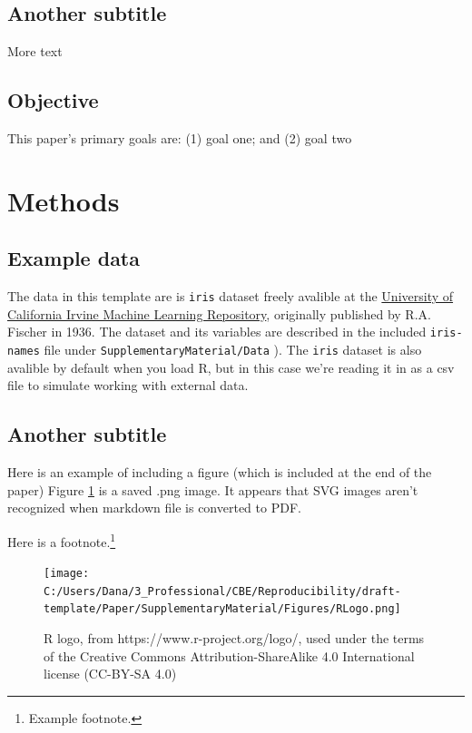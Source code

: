 \documentclass[]{elsarticle} %
\begin{document}
\subsection{Another subtitle}\label{another-subtitle}

More text

\subsection{Objective}\label{objective}

This paper's primary goals are: (1) goal one; and (2) goal two

\section{Methods}\label{methods}

\subsection{Example data}\label{example-data}

The data in this template are is \texttt{iris} dataset freely avalible
at the \href{https://archive.ics.uci.edu/ml/datasets/iris}{University of
California Irvine Machine Learning Repository}, originally published by
R.A. Fischer in 1936. The dataset and its variables are described in the
included \texttt{iris-names} file under
\texttt{SupplementaryMaterial/Data} ). The \texttt{iris} dataset is also
avalible by default when you load R, but in this case we're reading it
in as a csv file to simulate working with external data.

\subsection{Another subtitle}\label{another-subtitle-1}

Here is an example of including a figure (which is included at the end
of the paper) Figure \ref{fig:experimentimage} is a saved .png image. It
appears that SVG images aren't recognized when markdown file is
converted to PDF.

Here is a footnote.\footnote{Example footnote.}

\begin{figure}
\centering
\texttt{[image: C:/Users/Dana/3\_Professional/CBE/Reproducibility/draft-template/Paper/SupplementaryMaterial/Figures/RLogo.png]}
\caption{\label{fig:experimentimage}R logo, from
https://www.r-project.org/logo/, used under the terms of the Creative
Commons Attribution-ShareAlike 4.0 International license (CC-BY-SA 4.0)}
\end{figure}
\end{document}
